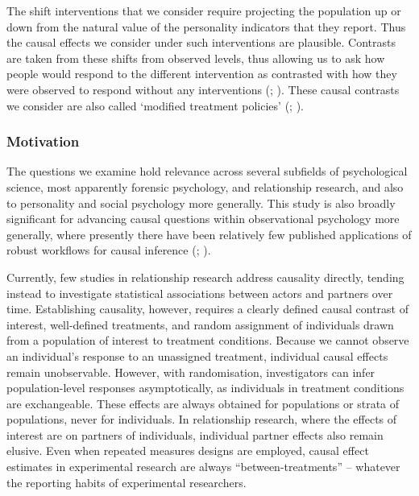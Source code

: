 \documentclass[
  single column]{article}
\begin{document}
The shift interventions that we consider require projecting the
population up or down from the natural value of the personality
indicators that they report. Thus the causal effects we consider under
such interventions are plausible. Contrasts are taken from these shifts
from observed levels, thus allowing us to ask how people would respond
to the different intervention as contrasted with how they were observed
to respond without any interventions (; ). These causal contrasts we consider are also called
`modified treatment policies' (; ).

\subsubsection{Motivation}\label{motivation}

The questions we examine hold relevance across several subfields of
psychological science, most apparently forensic psychology, and
relationship research, and also to personality and social psychology
more generally. This study is also broadly significant for advancing
causal questions within observational psychology more generally, where
presently there have been relatively few published applications of
robust workflows for causal inference
(;
).

Currently, few studies in relationship research address causality
directly, tending instead to investigate statistical associations
between actors and partners over time. Establishing causality, however,
requires a clearly defined causal contrast of interest, well-defined
treatments, and random assignment of individuals drawn from a population
of interest to treatment conditions. Because we cannot observe an
individual's response to an unassigned treatment, individual causal
effects remain unobservable. However, with randomisation, investigators
can infer population-level responses asymptotically, as individuals in
treatment conditions are exchangeable. These effects are always obtained
for populations or strata of populations, never for individuals. In
relationship research, where the effects of interest are on partners of
individuals, individual partner effects also remain elusive. Even when
repeated measures designs are employed, causal effect estimates in
experimental research are always ``between-treatments'' -- whatever the
reporting habits of experimental researchers.
\end{document}
